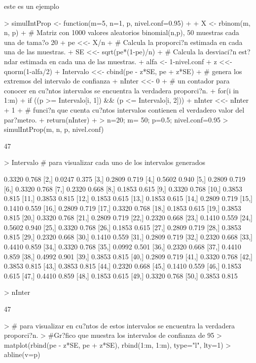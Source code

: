 \documentclass{article}
\begin{document}
este es un ejemplo
\begin{Schunk}
\begin{Sinput}
> simulIntProp <- function(m=5, n=1, p, nivel.conf=0.95)
+ {
+ X <- rbinom(m, n, p)
+ # Matriz con 1000 valores aleatorios binomial(n,p), 50 muestras cada una de tama?o 20
+ pe <<- X/n
+ # Calcula la proporci?n estimada en cada una de las muestras.
+ SE <<- sqrt(pe*(1-pe)/n)
+ # Calcula la desviaci?n est?ndar estimada en cada una de las muestras.
+ alfa <- 1-nivel.conf
+ z <<- qnorm(1-alfa/2)
+ Intervalo <<- cbind(pe - z*SE, pe + z*SE)
+ # genera los extremos del intervalo de confianza
+ nInter <<- 0
+ # un contador para conocer en cu?ntos intervalos se encuentra la verdadera proporci?n.
+ for(i in 1:m)
+ if ((p >= Intervalo[i, 1]) && (p <= Intervalo[i, 2]))
+ nInter <<- nInter + 1
+ # funci?n que cuenta cu?ntos intervalos contienen el verdadero valor del par?metro.
+ return(nInter)
+ }
> n=20; m= 50; p=0.5; nivel.conf=0.95
> simulIntProp(m, n, p, nivel.conf)
\end{Sinput}
\begin{Soutput}
[1] 47
\end{Soutput}
\begin{Sinput}
> Intervalo # para visualizar cada uno de los intervalos generados
\end{Sinput}
\begin{Soutput}
        [,1]  [,2]
 [1,] 0.3320 0.768
 [2,] 0.0247 0.375
 [3,] 0.2809 0.719
 [4,] 0.5602 0.940
 [5,] 0.2809 0.719
 [6,] 0.3320 0.768
 [7,] 0.2320 0.668
 [8,] 0.1853 0.615
 [9,] 0.3320 0.768
[10,] 0.3853 0.815
[11,] 0.3853 0.815
[12,] 0.1853 0.615
[13,] 0.1853 0.615
[14,] 0.2809 0.719
[15,] 0.1410 0.559
[16,] 0.2809 0.719
[17,] 0.3320 0.768
[18,] 0.1853 0.615
[19,] 0.3853 0.815
[20,] 0.3320 0.768
[21,] 0.2809 0.719
[22,] 0.2320 0.668
[23,] 0.1410 0.559
[24,] 0.5602 0.940
[25,] 0.3320 0.768
[26,] 0.1853 0.615
[27,] 0.2809 0.719
[28,] 0.3853 0.815
[29,] 0.2320 0.668
[30,] 0.1410 0.559
[31,] 0.2809 0.719
[32,] 0.2320 0.668
[33,] 0.4410 0.859
[34,] 0.3320 0.768
[35,] 0.0992 0.501
[36,] 0.2320 0.668
[37,] 0.4410 0.859
[38,] 0.4992 0.901
[39,] 0.3853 0.815
[40,] 0.2809 0.719
[41,] 0.3320 0.768
[42,] 0.3853 0.815
[43,] 0.3853 0.815
[44,] 0.2320 0.668
[45,] 0.1410 0.559
[46,] 0.1853 0.615
[47,] 0.4410 0.859
[48,] 0.1853 0.615
[49,] 0.3320 0.768
[50,] 0.3853 0.815
\end{Soutput}
\begin{Sinput}
> nInter
\end{Sinput}
\begin{Soutput}
[1] 47
\end{Soutput}
\begin{Sinput}
> # para visualizar en cu?ntos de estos intervalos se encuentra la verdadera proporci?n.
> #Gr?fico que muestra los intervalos de confianza de 95% que contienen y no contienen el verdadero valor del par?metro p.
> matplot(rbind(pe - z*SE, pe + z*SE), rbind(1:m, 1:m), type="l", lty=1)
> abline(v=p)
\end{Sinput}
\end{Schunk}
\end{document}
